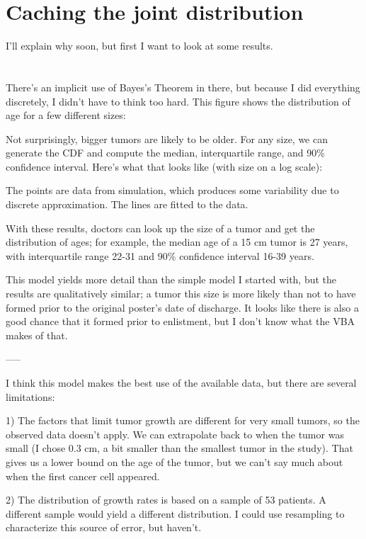 \documentclass[12pt]{book}
\begin{document}
\section{Caching the joint distribution}



  I'll explain why soon, but first I want to
look at some results.



\section{}


  There's an implicit use of
Bayes's Theorem in there, but because I did everything discretely, I
didn't have to think too hard.  This figure shows the distribution of
age for a few different sizes:

Not surprisingly, bigger tumors are likely to be older.  For any size, we can generate the CDF and compute the median, interquartile range, and 90\% confidence interval.  Here's what that looks like (with size on a log scale):

The points are data from simulation, which produces some variability due to discrete approximation.  The lines are fitted to the data.

With these results, doctors can look up the size of a tumor and get the distribution of ages; for example, the median age of a 15 cm tumor is 27 years, with interquartile range 22-31 and 90\% confidence interval 16-39 years.

This model yields more detail than the simple model I started with, but the results are qualitatively similar; a tumor this size is more likely than not to have formed prior to the original poster's date of discharge.  It looks like there is also a good chance that it formed prior to enlistment, but I don't know what the VBA makes of that.

-----

I think this model makes the best use of the available data, but there are several limitations:

1) The factors that limit tumor growth are different for very small tumors, so the observed data doesn't apply.  We can extrapolate back to when the tumor was small (I chose 0.3 cm, a bit smaller than the smallest tumor in the study).  That gives us a lower bound on the age of the tumor, but we can't say much about when the first cancer cell appeared.

2) The distribution of growth rates is based on a sample of 53 patients.  A different sample would yield a different distribution.  I could use resampling to characterize this source of error, but haven't.
\end{document}
